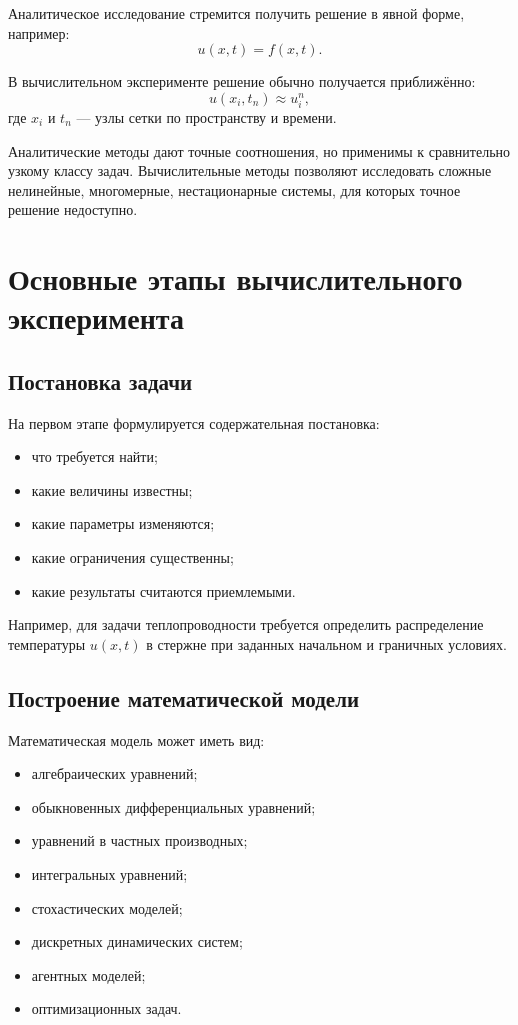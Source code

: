 \documentclass[12pt,a4paper]{article}
\theoremstyle{definition}
\theoremstyle{plain}
\begin{document}
Аналитическое исследование стремится получить решение в явной форме, например:
\[
u(x,t) = f(x,t).
\]

В вычислительном эксперименте решение обычно получается приближённо:
\[
u(x_i,t_n) \approx u_i^n,
\]
где $x_i$ и $t_n$ --- узлы сетки по пространству и времени.

Аналитические методы дают точные соотношения, но применимы к сравнительно узкому классу задач. Вычислительные методы позволяют исследовать сложные нелинейные, многомерные, нестационарные системы, для которых точное решение недоступно.

\section{Основные этапы вычислительного эксперимента}

\subsection{Постановка задачи}

На первом этапе формулируется содержательная постановка:
\begin{itemize}
    \item что требуется найти;
    \item какие величины известны;
    \item какие параметры изменяются;
    \item какие ограничения существенны;
    \item какие результаты считаются приемлемыми.
\end{itemize}

Например, для задачи теплопроводности требуется определить распределение температуры $u(x,t)$ в стержне при заданных начальном и граничных условиях.

\subsection{Построение математической модели}

Математическая модель может иметь вид:
\begin{itemize}
    \item алгебраических уравнений;
    \item обыкновенных дифференциальных уравнений;
    \item уравнений в частных производных;
    \item интегральных уравнений;
    \item стохастических моделей;
    \item дискретных динамических систем;
    \item агентных моделей;
    \item оптимизационных задач.
\end{itemize}
\end{document}
